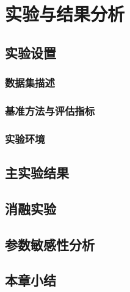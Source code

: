 \chapter{实验与结果分析}
\label{ch:experiments}


\section{实验设置}
\label{sec:exp-setup}

\subsection{数据集描述}
\label{subsec:datasets}

\subsection{基准方法与评估指标}
\label{subsec:baselines}

\subsection{实验环境}
\label{subsec:env}

\section{主实验结果}
\label{sec:main-results}

\section{消融实验}
\label{sec:ablation}

\section{参数敏感性分析}
\label{sec:sensitivity}

\section{本章小结}
\label{sec:ch4-summary}
